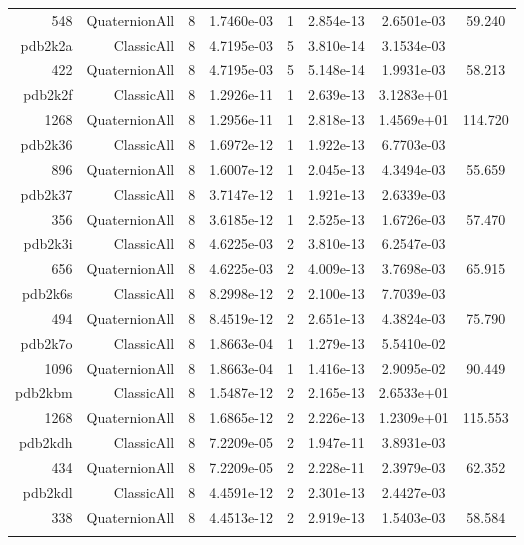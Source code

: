 \begin{xltabular}{\textwidth}{r|rcS[table-format=1.4e+2]cS[table-format=1.3e+2]S[table-format=1.4e+2]S[table-format=-1.3]}
548 & QuaternionAll & 8 & 1.7460e-03 & 1 & 2.854e-13 & 2.6501e-03 & 59.240\\  \addlinespace
pdb2k2a & ClassicAll & 8 & 4.7195e-03 & 5 & 3.810e-14 & 3.1534e-03 & \\
422 & QuaternionAll & 8 & 4.7195e-03 & 5 & 5.148e-14 & 1.9931e-03 & 58.213\\  \addlinespace
pdb2k2f & ClassicAll & 8 & 1.2926e-11 & 1 & 2.639e-13 & 3.1283e+01 & \\
1268 & QuaternionAll & 8 & 1.2956e-11 & 1 & 2.818e-13 & 1.4569e+01 & 114.720\\  \addlinespace
pdb2k36 & ClassicAll & 8 & 1.6972e-12 & 1 & 1.922e-13 & 6.7703e-03 & \\
896 & QuaternionAll & 8 & 1.6007e-12 & 1 & 2.045e-13 & 4.3494e-03 & 55.659\\  \addlinespace
pdb2k37 & ClassicAll & 8 & 3.7147e-12 & 1 & 1.921e-13 & 2.6339e-03 & \\
356 & QuaternionAll & 8 & 3.6185e-12 & 1 & 2.525e-13 & 1.6726e-03 & 57.470\\  \addlinespace
pdb2k3i & ClassicAll & 8 & 4.6225e-03 & 2 & 3.810e-13 & 6.2547e-03 & \\
656 & QuaternionAll & 8 & 4.6225e-03 & 2 & 4.009e-13 & 3.7698e-03 & 65.915\\  \addlinespace
pdb2k6s & ClassicAll & 8 & 8.2998e-12 & 2 & 2.100e-13 & 7.7039e-03 & \\
494 & QuaternionAll & 8 & 8.4519e-12 & 2 & 2.651e-13 & 4.3824e-03 & 75.790\\  \addlinespace
pdb2k7o & ClassicAll & 8 & 1.8663e-04 & 1 & 1.279e-13 & 5.5410e-02 & \\
1096 & QuaternionAll & 8 & 1.8663e-04 & 1 & 1.416e-13 & 2.9095e-02 & 90.449\\  \addlinespace
pdb2kbm & ClassicAll & 8 & 1.5487e-12 & 2 & 2.165e-13 & 2.6533e+01 & \\
1268 & QuaternionAll & 8 & 1.6865e-12 & 2 & 2.226e-13 & 1.2309e+01 & 115.553\\  \addlinespace
pdb2kdh & ClassicAll & 8 & 7.2209e-05 & 2 & 1.947e-11 & 3.8931e-03 & \\
434 & QuaternionAll & 8 & 7.2209e-05 & 2 & 2.228e-11 & 2.3979e-03 & 62.352\\  \addlinespace
pdb2kdl & ClassicAll & 8 & 4.4591e-12 & 2 & 2.301e-13 & 2.4427e-03 & \\
338 & QuaternionAll & 8 & 4.4513e-12 & 2 & 2.919e-13 & 1.5403e-03 & 58.584\\  \addlinespace

\end{xltabular}
